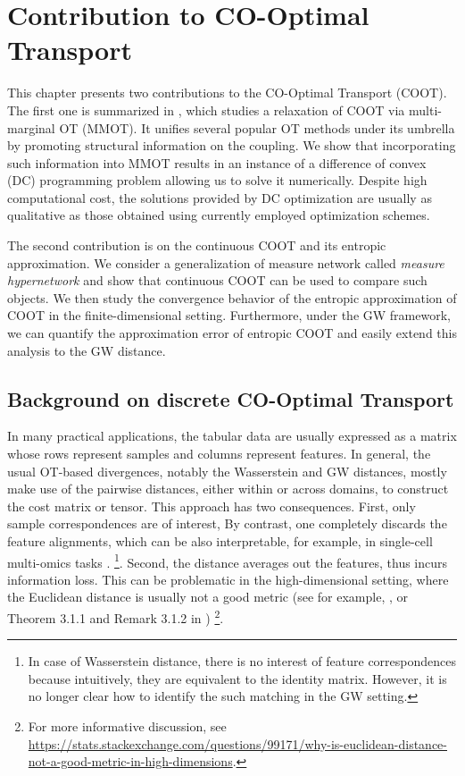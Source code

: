 
\chapter[Contribution to CO-Optimal Transport]{Contribution to CO-Optimal Transport}
\label{chap:coot}

\renewcommand{\contentsname}{Contents}
\localtableofcontents*
{}

\hfill \break
This chapter presents two contributions to the CO-Optimal Transport (COOT).
The first one is summarized in \citep{Tran21},
which studies a relaxation of COOT via multi-marginal OT (MMOT).
It unifies several popular OT methods under its umbrella by promoting structural information
on the coupling. We show that incorporating such information into MMOT results in an
instance of a difference of convex (DC) programming problem allowing us to solve it numerically.
Despite high computational cost, the solutions provided by DC optimization are usually
as qualitative as those obtained using currently employed optimization schemes.

The second contribution is on the continuous COOT and its entropic approximation.
We consider a generalization of measure network called \textit{measure hypernetwork}
and show that continuous COOT can be used to compare such objects.
We then study the convergence behavior of the entropic approximation of COOT in the finite-dimensional
setting. Furthermore, under the GW framework, we can quantify the approximation error of
entropic COOT and easily extend this analysis to the GW distance.

\raggedbottom

\section{Background on discrete CO-Optimal Transport}

In many practical applications, the tabular data are usually expressed as a matrix whose rows
represent samples and columns represent features.
In general, the usual OT-based divergences, notably the Wasserstein and GW distances, mostly make
use of the pairwise distances, either within or across domains, to construct the cost matrix
or tensor. This approach has two consequences. First, only sample correspondences are of interest,
By contrast, one completely discards the feature alignments, which can be also interpretable,
for example, in single-cell multi-omics tasks \citep{Demetci20b}.
\footnote{In case of Wasserstein distance, there is no interest of feature correspondences
because intuitively, they are equivalent to the identity matrix. However,
it is no longer clear how to identify the such matching in the GW setting.}.
Second, the distance averages out the features, thus incurs information loss.
This can be problematic in the high-dimensional setting,
where the Euclidean distance is usually not a good metric
(see for example, \citep{Aggarwal01}, or Theorem 3.1.1 and Remark 3.1.2 in \citep{Vershynin18})
\footnote{For more informative discussion,
see \url{https://stats.stackexchange.com/questions/99171/why-is-euclidean-distance-not-a-good-metric-in-high-dimensions}.}.

